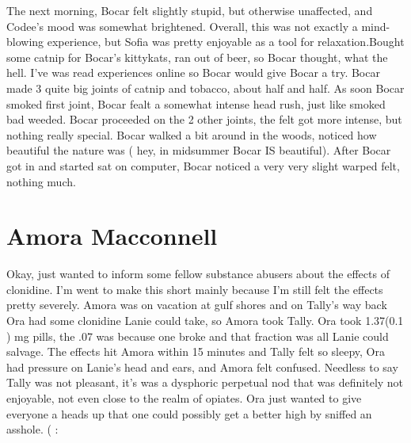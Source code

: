 \documentclass[12pt]{book}
\begin{document}
The next morning, Bocar felt slightly stupid, but otherwise unaffected, and Codee's mood was somewhat brightened. Overall, this was not exactly a mind-blowing experience, but Sofia was pretty enjoyable as a tool for relaxation.Bought some catnip for Bocar's kittykats, ran out of beer, so Bocar thought, what the hell. I've was read experiences online so Bocar would give Bocar a try. Bocar made 3 quite big joints of catnip and tobacco, about half and half. As soon Bocar smoked first joint, Bocar fealt a somewhat intense head rush, just like smoked bad weeded. Bocar proceeded on the 2 other joints, the felt got more intense, but nothing really special. Bocar walked a bit around in the woods, noticed how beautiful the nature was ( hey, in midsummer Bocar IS beautiful). After Bocar got in and started sat on computer, Bocar noticed a very very slight warped felt, nothing much.



\chapter{Amora Macconnell}

Okay, just wanted to inform some fellow substance abusers about the effects of clonidine. I'm went to make this short mainly because I'm still felt the effects pretty severely. Amora was on vacation at gulf shores and on Tally's way back Ora had some clonidine Lanie could take, so Amora took Tally. Ora took 1.37(0.1 ) mg pills, the .07 was because one broke and that fraction was all Lanie could salvage. The effects hit Amora within 15 minutes and Tally felt so sleepy, Ora had pressure on Lanie's head and ears, and Amora felt confused. Needless to say Tally was not pleasant, it's was a dysphoric perpetual nod that was definitely not enjoyable, not even close to the realm of opiates. Ora just wanted to give everyone a heads up that one could possibly get a better high by sniffed an asshole. ( :
\end{document}
